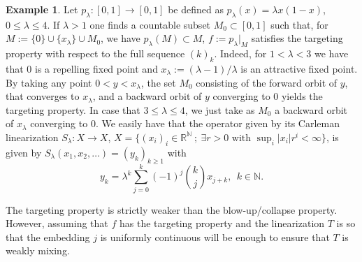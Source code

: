 \documentclass[12pt,english]{amsart}
\numberwithin{equation}{section}
\theoremstyle{plain}
\theoremstyle{definition}
\newtheorem{example}[theorem]{Example}
\newcommand{\N}{\mathbb{N}}
\newcommand{\R}{\mathbb{R}}
\newcommand{\abs}[1]{\left\lvert#1\right\rvert}
\begin{document}
\begin{example}\label{logisticf}
    Let $p_\lambda\colon [0,1]\to [0,1]$ be defined as $p_\lambda (x)=\lambda x(1-x)$, $0\leq \lambda\leq 4$. 
    If $\lambda>1$ one finds a countable subset $M_0\subset [0,1]$ such that, for $M:=\{0\}\cup \{x_\lambda\}\cup M_0$, we have $p_\lambda (M)\subset M$, $f:=p_\lambda|_M$ satisfies the targeting property with respect to the full sequence $(k)_k$. Indeed, for $1<\lambda<3$ we have that $0$ is a repelling fixed point and $x_\lambda:=(\lambda-1)/\lambda$ is an attractive fixed point. By taking any point $0<y<x_\lambda$, the set $M_0$ consisting of the forward orbit of $y$, that converges to $x_\lambda$, and a backward orbit of $y$ converging to $0$ yields the targeting property. In case that $3\leq \lambda\leq 4$, we just take as $M_0$ a backward orbit of $x_\lambda$ converging to $0$. We easily have that the operator given by its {Carleman linearization} $S_\lambda \colon X \to X$, $X=\{ (x_i)_i\in\R^\N \ ; \ \exists r>0 \mbox{ with } \sup_i\abs{x_i}r^i<\infty \}$, is given by $S_{\lambda}(x_1,x_2,\dots )=(y_k)_{k\ge 1}$ with
$$
y_k=\lambda^k\sum_{j=0}^k (-1)^j\binom{k}{j}x_{j+k}, \ \ k\in \N. 
$$
\end{example}



The targeting property is strictly weaker than the blow-up/collapse property. However, assuming that $f$ has the targeting property and the linearization $T$ is so that the embedding $j$ is uniformly continuous will be enough to ensure  that $T$ is weakly mixing.
\end{document}
